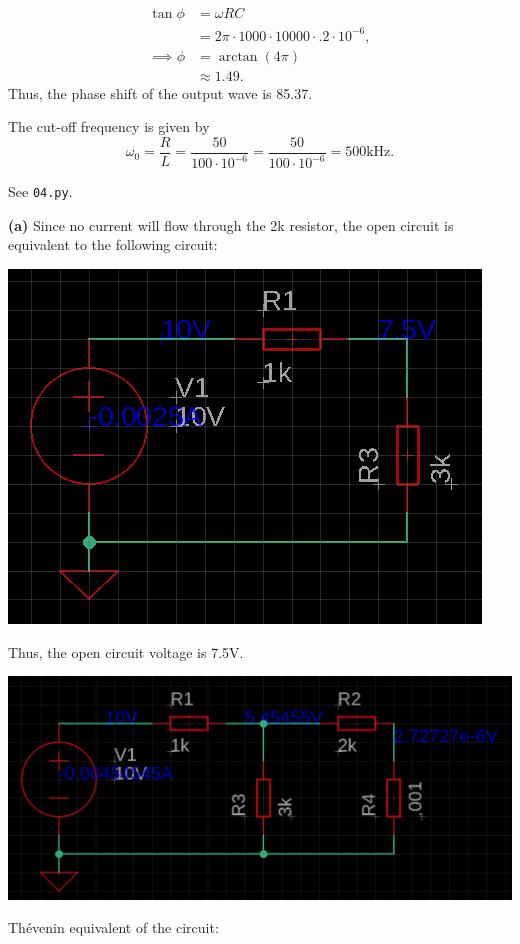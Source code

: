 \documentclass{article}
\begin{document}
\begin{align*}
    \tan\phi &= \omega RC \\
             &= 2\pi\cdot1000\cdot10000\cdot.2\cdot10^{-6}, \\
    \implies \phi &= \arctan(4\pi) \\
                  &\approx 1.49.
\end{align*}
Thus, the phase shift of the output wave is 85.37\degree. %

\newpage{}

The cut-off frequency is given by $$\omega_0 = \frac RL = \frac{50}{100\cdot10^{-6}} = \frac{50}{100\cdot10^{-6}} = 500\text{kHz}.$$

\newpage{}

\newpage{}

\newpage{}

\newpage{}

\newpage{}

\newpage{}

See \texttt{04.py}.

\newpage{}

{\bf (a)}
Since no current will flow through the 2k resistor, the open circuit is equivalent to the following circuit:
\begin{center}
\includegraphics{schematic04.png}
\end{center}
Thus, the open circuit voltage is 7.5V.

\begin{center}
\includegraphics[scale=0.45]{schematic042.png}
\end{center}

Thévenin equivalent of the circuit:
\begin{center}
\end{center}
\end{document}
